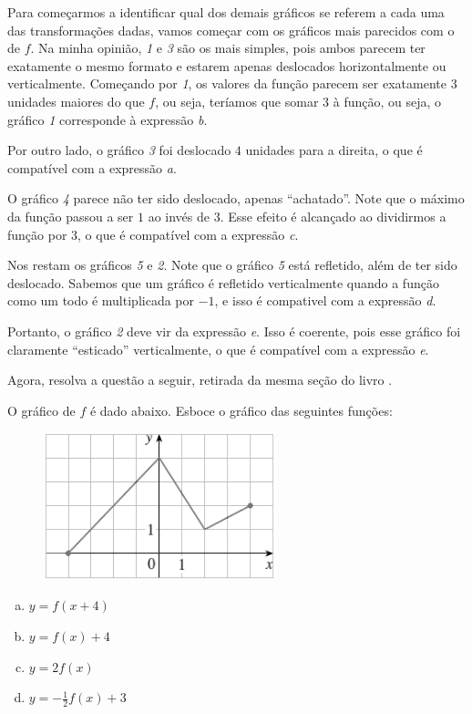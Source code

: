 \documentclass[main_estudante.tex]{subfiles}
\begin{document}
Para começarmos a identificar qual dos demais gráficos se referem a cada uma das transformações dadas, vamos começar com os gráficos mais parecidos com o de $f$. Na minha opinião, \textit{1} e \textit{3} são os mais simples, pois ambos parecem ter exatamente o mesmo formato e estarem apenas deslocados horizontalmente ou verticalmente. Começando por \textit{1}, os valores da função parecem ser exatamente $3$ unidades maiores do que $f$, ou seja, teríamos que somar $3$ à função, ou seja, o gráfico \textit{1} corresponde à expressão \textit{b}.

Por outro lado, o gráfico \textit{3} foi deslocado $4$ unidades para a direita, o que é compatível com a expressão \textit{a}.

O gráfico \textit{4} parece não ter sido deslocado, apenas ``achatado''. Note que o máximo da função passou a ser $1$ ao invés de $3$. Esse efeito é alcançado ao dividirmos a função por $3$, o que é compatível com a expressão \textit{c}.

Nos restam os gráficos \textit{5} e \textit{2}. Note que o gráfico \textit{5} está refletido, além de ter sido deslocado. Sabemos que um gráfico é refletido verticalmente quando a função como um todo é multiplicada por $-1$, e isso é compativel com a expressão \textit{d}.

Portanto, o gráfico \textit{2} deve vir da expressão \textit{e}. Isso é coerente, pois esse gráfico foi claramente ``esticado'' verticalmente, o que é compatível com a expressão \textit{e}.

Agora, resolva a questão a seguir, retirada da mesma seção do livro .

\begin{resolva}
O gráfico de $f$ é dado abaixo. Esboce o gráfico das seguintes funções:

\begin{figure}[h]
\centering
\includegraphics[width=0.6\textwidth]{./img/c7r2.png}
\end{figure}

\begin{enumerate}[a)]
\item $y=f(x+4)$
\item $y=f(x)+4$
\item $y=2f(x)$
\item $y= -\frac{1}{2}f(x)+3$
\end{enumerate}
\end{resolva}
\end{document}
